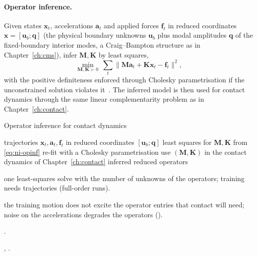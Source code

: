 
\paragraph{Operator inference.}
Given states $\bm x_t$, accelerations $\bm a_t$ and applied forces $\bm f_t$ in reduced coordinates $\bm x=[\bm u_b;\bm q]$ (the physical boundary unknowns $\bm u_b$ plus modal amplitudes $\bm q$ of the fixed-boundary interior modes, a Craig--Bampton structure as in Chapter~\ref{ch:cms}), infer $\bm M,\bm K$ by least squares,
\begin{equation}\label{eq:ni-opinf}
\min_{\bm M,\bm K\succ0}\ \sum_t\|\bm M\bm a_t+\bm K\bm x_t-\bm f_t\|^2,
\end{equation}
with the positive definiteness enforced through Cholesky parametrisation if the unconstrained solution violates it~\cite{peherstorfer2016opinf,manvelyan2025}. The inferred model is then used for contact dynamics through the same linear complementarity problem as in Chapter~\ref{ch:contact}.

\begin{algbox}{Operator inference for contact dynamics}
\begin{pseudo}
\Require trajectories $\bm x_t,\bm a_t,\bm f_t$ in reduced coordinates $[\bm u_b;\bm q]$
\State least squares for $\bm M,\bm K$ from \eqref{eq:ni-opinf}
  \State re-fit with a Cholesky parametrisation 
\EndIf
\State use $(\bm M,\bm K)$ in the contact dynamics of Chapter~\ref{ch:contact}
\Ensure inferred reduced operators
\end{pseudo}
\begin{algdet}
\item[Cost] one least-squares solve with the number of unknowns of the operators; training needs trajectories (full-order runs).
\item[Fails when] the training motion does not excite the operator entries that contact will need; noise on the accelerations degrades the operators ().
\item[Code] .
\item[Verified in] , .
\end{algdet}
\end{algbox}

